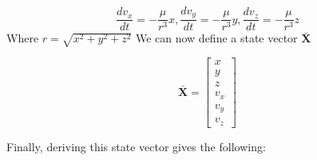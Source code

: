 \documentclass[a4paper, 12pt]{article}  %
\begin{document}
\begin{equation}
    \frac{dv_{x}}{dt} = -\frac{\mu}{r^3} x, \frac{dv_{y}}{dt} = -\frac{\mu}{r^3} y, \frac{dv_{z}}{dt} = -\frac{\mu}{r^3} z
\end{equation}
Where $r = \sqrt{x^{2} + y^{2} + z^{2}}$
\newline
We can now define a state vector $\mathbf{\bar{X}}$


\begin{equation}
    \mathbf{\bar{X}} = 
    \begin{bmatrix}
        x \\
        y \\
        z \\
        v_x \\
        v_y \\
        v_z
        \end{bmatrix}
\end{equation}

Finally, deriving this state vector gives the following:
\end{document}
